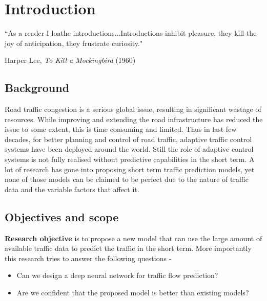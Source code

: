 

\chapter{Introduction} %

\label{Chapter1} %


{``As a reader I loathe introductions...Introductions inhibit pleasure, they kill the joy of
anticipation, they frustrate curiosity."}
\begin{flushright}
Harper Lee, \textit{To Kill a Mockingbird} (1960)
\end{flushright}

\section{Background}
Road traffic congestion is a serious global issue, resulting in significant wastage of resources.
While improving and extending the road infrastructure has reduced the issue to some extent, this is
time consuming and limited. Thus in last few decades, for better planning and control of road
traffic, adaptive traffic control systems have been deployed around the world. Still the role of
adaptive control systems is not fully realised without predictive capabilities in the short term. A
lot of research has gone into proposing short term traffic prediction models, yet none of those
models can be claimed to be perfect due to the nature of traffic data and the variable factors that
affect it.

\section{Objectives and scope}

\textbf{Research objective} is to propose a new model that can use the large amount of available
traffic data to predict the traffic in the short term. More importantly this research tries to
answer the following questions -

\begin{itemize}
\item Can we design a deep neural network for traffic flow prediction?
\item Are we confident that the proposed model is better than existing models?
\end{itemize}

